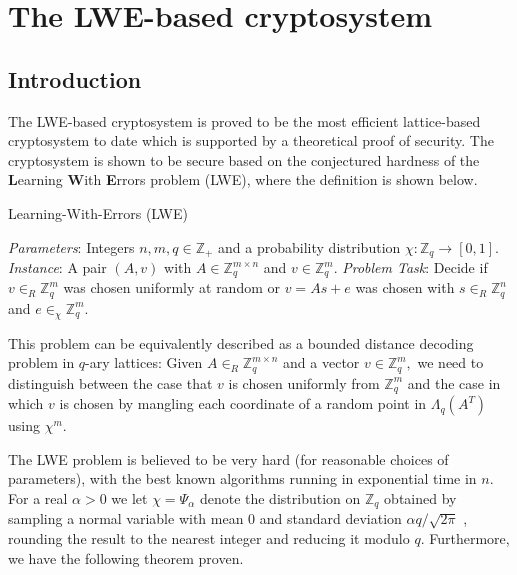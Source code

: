 \section{The LWE-based cryptosystem}

\subsection{Introduction}

The LWE-based cryptosystem is proved to be the most efficient lattice-based cryptosystem to date which is supported by a theoretical proof of security. The cryptosystem is shown to be secure based on the conjectured hardness of the \textbf{L}earning \textbf{W}ith \textbf{E}rrors problem (LWE), where the definition is shown below.

\begin{algorithm}
    \caption{Learning-With-Errors (LWE)}
    \begin{algorithmic}
        \State \textit{Parameters}: Integers $n, m, q \in \mathbb{Z}_{+}$ and a probability distribution $\chi : \mathbb{Z}_{q} \rightarrow[0,1]$.
        \State \textit{Instance}: A pair $(A, v)$ with $A \in \mathbb{Z}_{q}^{m \times n}$ and $v \in \mathbb{Z}_{q}^{m}$.
        \State \textit{Problem Task}: Decide if $v \in_{R} \mathbb{Z}_{q}^{m}$ was chosen uniformly at random or $v=A s+e$ was chosen with $s \in _R \mathbb{Z}_{q}^{n}$ and $e \in_{\chi} \mathbb{Z}_{q}^{m}$.
    \end{algorithmic}
\end{algorithm}

This problem can be equivalently described as a bounded distance decoding problem in $q$-ary lattices: Given $A \in_{R} \mathbb{Z}_{q}^{m \times n}$ and a vector $v \in \mathbb{Z}_{q}^{m},$ we need to distinguish between the case that $v$ is chosen uniformly from $\mathbb{Z}_{q}^{m}$ and the case in which $v$ is chosen by mangling each coordinate of a random point in $\Lambda_{q}\left(A^{T}\right)$ using $\chi^{m}.$

The LWE problem is believed to be very hard (for reasonable choices of parameters), with the best known algorithms running in exponential time in $n$. For a real $\alpha>0$ we let $\chi=\Psi_{\alpha}$ denote the distribution on $\mathbb{Z}_{q}$ obtained by sampling a normal variable with mean 0 and standard deviation $\alpha q / \sqrt{2 \pi}$ , rounding the result to the nearest integer and reducing it modulo $q$. Furthermore, we have the following theorem proven.

